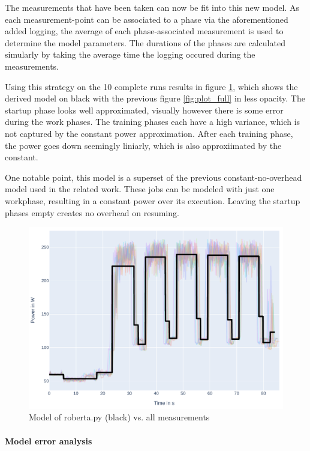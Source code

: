 The measurements that have been taken can now be fit into this new model. 
As each measurement-point can be associated to a phase via the aforementioned added logging, the average of each phase-associated measurement is used to determine the model parameters. 
The durations of the phases are calculated simularly by taking the average time the logging occured during the measurements.

Using this strategy on the 10 complete runs results in figure \ref{fig:model_overlaid}, which shows the derived model on black with the previous figure \ref{fig:plot_full} in less opacity. 
The startup phase looks well approximated, visually however there is some error during the work phases.
The training phases each have a high variance, which is not captured by the constant power approximation. After each training  phase, the power goes down seemingly liniarly, which is also approxiimated by the constant.

One notable point, this model is a superset of the previous constant-no-overhead model used in the related work.
These jobs can be modeled with just one workphase, resulting in a constant power over its execution. Leaving the startup phases empty creates no overhead on resuming.

\begin{figure}
    \includegraphics[width=\linewidth]{power-measurements/model_overlaid.pdf}
    \caption{Model of roberta.py (black) vs. all measurements}
    \label{fig:model_overlaid}
\end{figure}

\paragraph{Model error analysis}

